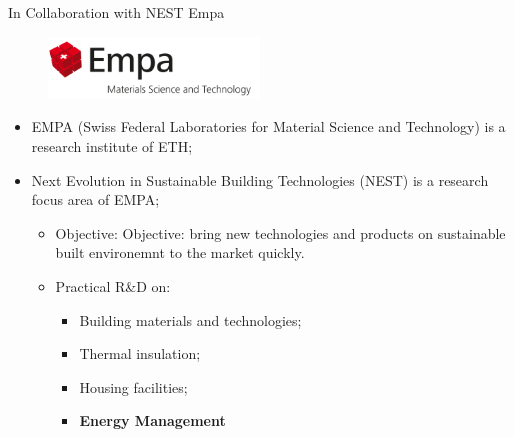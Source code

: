 \begin{frame}[t,fragile]{In Collaboration with NEST Empa}
    \vspace{-.3cm}
    \begin{figure}[htbp]
        \centering
     \includegraphics[width=0.5\textwidth]{../img/logo-empa.png}
    \end{figure}
    \begin{itemize}
        \item EMPA (Swiss Federal Laboratories for Material Science and Technology) is a research institute of ETH;
        \vspace{.2cm}
        \item Next Evolution in Sustainable Building Technologies (NEST) is a research focus area of EMPA;
        \vspace{.2cm}
            \begin{itemize}
                \item Objective: Objective: bring new technologies and products on sustainable built environemnt to the market quickly.
                \vspace{.2cm}
                \item Practical R\&D on:
                \begin{itemize}
                    \item Building materials and technologies;
                    \item Thermal insulation;
                    \item Housing facilities;
                    \item \textbf{Energy Management}
                \end{itemize}
            \end{itemize}
    \end{itemize}
\end{frame}